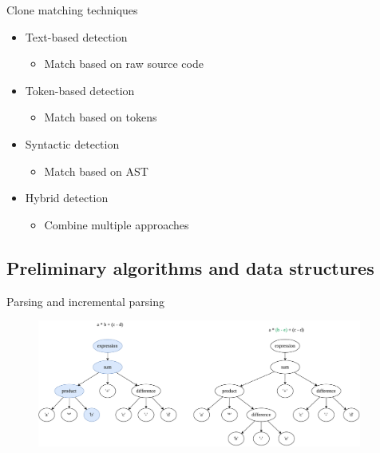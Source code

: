\documentclass[aspectratio=1610, xcolor=table]{beamer}
\begin{document}
\begin{frame}{Clone matching techniques}
    \begin{itemize}
        \item Text-based detection
            \begin{itemize}
                \item Match based on raw source code
            \end{itemize}
        \item Token-based detection
            \begin{itemize}
                \item Match based on tokens
            \end{itemize}
        \item Syntactic detection
            \begin{itemize}
                \item Match based on AST
            \end{itemize}
        \item Hybrid detection
            \begin{itemize}
                \item Combine multiple approaches
            \end{itemize}
    \end{itemize}
\end{frame}


\subsection{Preliminary algorithms and data structures}
\begin{frame}{Parsing and incremental parsing}
    \begin{figure}
        \begin{center}
            \includegraphics[width=0.95\textwidth]{figures/incrementalparsing.drawio.pdf}
        \end{center}
    \end{figure}
\end{frame}
\end{document}
